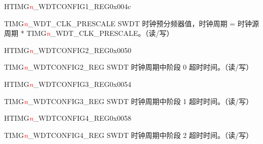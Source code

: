 \begin{register}{H}{TIMG\textcolor{red}{\it{n}}\_WDTCONFIG1\_REG}{0x004c}\label{regdesc:TIMERSWDTCONFIG1REG}
%
%
\regnewline%
\begin{regdesc}\begin{reglist}
\item [TIMG\textcolor{red}{\it{n}}\_WDT\_CLK\_PRESCALE] SWDT 时钟预分频器值，时钟周期 = 时钟源周期 * TIMG\textcolor{red}{\it{n}}\_WDT\_CLK\_PRESCALE。（读/写）
\end{reglist}\end{regdesc}
\end{register}


\begin{register}{H}{TIMG\textcolor{red}{\it{n}}\_WDTCONFIG2\_REG}{0x0050}\label{regdesc:TIMERSWDTCONFIG2REG}
%
\regnewline%
\begin{regdesc}\begin{reglist}
\item [TIMG\textcolor{red}{\it{n}}\_WDTCONFIG2\_REG] SWDT 时钟周期中阶段 0 超时时间。（读/写）
\end{reglist}\end{regdesc}
\end{register}


\begin{register}{H}{TIMG\textcolor{red}{\it{n}}\_WDTCONFIG3\_REG}{0x0054}\label{regdesc:TIMERSWDTCONFIG3REG}
%
\regnewline%
\begin{regdesc}\begin{reglist}
\item [TIMG\textcolor{red}{\it{n}}\_WDTCONFIG3\_REG] SWDT 时钟周期中阶段 1 超时时间。（读/写）
\end{reglist}\end{regdesc}
\end{register}


\begin{register}{H}{TIMG\textcolor{red}{\it{n}}\_WDTCONFIG4\_REG}{0x0058}\label{regdesc:TIMERSWDTCONFIG4REG}
%
\regnewline%
\begin{regdesc}\begin{reglist}
\item [TIMG\textcolor{red}{\it{n}}\_WDTCONFIG4\_REG] SWDT 时钟周期中阶段 2 超时时间。（读/写）
\end{reglist}\end{regdesc}
\end{register}


